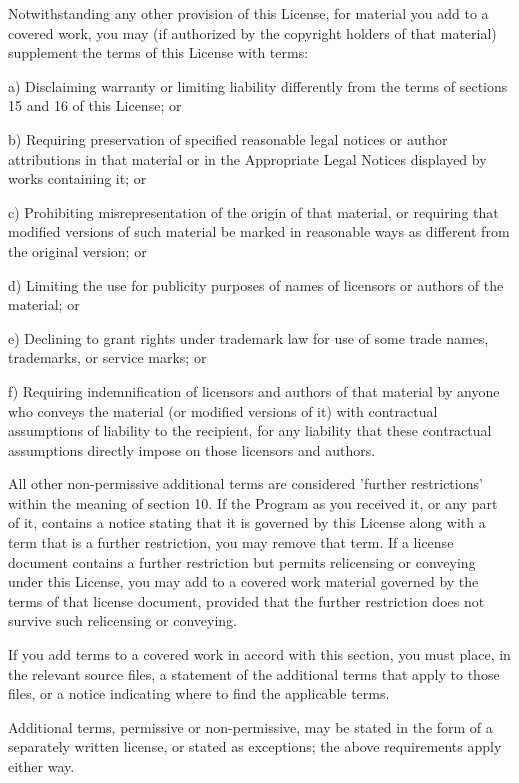 \documentclass{article}
\begin{document}
  Notwithstanding any other provision of this License, for material you
add to a covered work, you may (if authorized by the copyright holders of
that material) supplement the terms of this License with terms:

    a) Disclaiming warranty or limiting liability differently from the
    terms of sections 15 and 16 of this License; or

    b) Requiring preservation of specified reasonable legal notices or
    author attributions in that material or in the Appropriate Legal
    Notices displayed by works containing it; or

    c) Prohibiting misrepresentation of the origin of that material, or
    requiring that modified versions of such material be marked in
    reasonable ways as different from the original version; or

    d) Limiting the use for publicity purposes of names of licensors or
    authors of the material; or

    e) Declining to grant rights under trademark law for use of some
    trade names, trademarks, or service marks; or

    f) Requiring indemnification of licensors and authors of that
    material by anyone who conveys the material (or modified versions of
    it) with contractual assumptions of liability to the recipient, for
    any liability that these contractual assumptions directly impose on
    those licensors and authors.

  All other non-permissive additional terms are considered 'further
restrictions' within the meaning of section 10.  If the Program as you
received it, or any part of it, contains a notice stating that it is
governed by this License along with a term that is a further
restriction, you may remove that term.  If a license document contains
a further restriction but permits relicensing or conveying under this
License, you may add to a covered work material governed by the terms
of that license document, provided that the further restriction does
not survive such relicensing or conveying.

  If you add terms to a covered work in accord with this section, you
must place, in the relevant source files, a statement of the
additional terms that apply to those files, or a notice indicating
where to find the applicable terms.

  Additional terms, permissive or non-permissive, may be stated in the
form of a separately written license, or stated as exceptions;
the above requirements apply either way.
\end{document}
